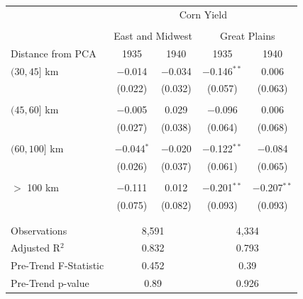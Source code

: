 \documentclass[12pt]{article}
\begin{document}
\begin{appendices}
\begin{table}
\begin{threeparttable}[t]
\begin{tabular}{lcccc}
    \hline\hline
& \multicolumn{4}{c}{Corn Yield} \\
\cline{2-5} \\ 
& \multicolumn{2}{c}{East and Midwest} & \multicolumn{2}{c}{Great Plains} \\
Distance from PCA& 1935          & 1940         & 1935           & 1940            \\ \hline
$(30, 45]$ km    & $-$0.014      & $-$0.034     & $-$0.146$^{**}$& 0.006           \\
                 & (0.022)       & (0.032)      & (0.057)        & (0.063)         \\
                 &               &              &                &                 \\
$(45, 60]$ km    & $-$0.005      & 0.029        & $-$0.096       & 0.006           \\
                 & (0.027)       & (0.038)      & (0.064)        & (0.068)         \\
                 &               &              &                &                 \\
$(60, 100]$ km   & $-$0.044$^{*}$& $-$0.020     & $-$0.122$^{**}$& $-$0.084        \\
                 & (0.026)       & (0.037)      & (0.061)        & (0.065)         \\
                 &               &              &                &                 \\
$>$ 100 km       & $-$0.111      & 0.012        & $-$0.201$^{**}$& $-$0.207$^{**}$ \\
                 & (0.075)       & (0.082)      & (0.093)        & (0.093)         \\
                 &               &              &                &                 \\ \hline \\[-1.8ex]
Observations          & \multicolumn{2}{c}{8,591}  & \multicolumn{2}{c}{4,334} \\
Adjusted R$^{2}$      & \multicolumn{2}{c}{0.832}  & \multicolumn{2}{c}{0.793} \\
Pre-Trend F-Statistic & \multicolumn{2}{c}{0.452}  & \multicolumn{2}{c}{0.39 } \\
Pre-Trend p-value     & \multicolumn{2}{c}{0.89 }  & \multicolumn{2}{c}{0.926} \\ 
\hline\hline


\end{tabular}
\end{threeparttable}
\end{table}
\end{appendices}
\end{document}
